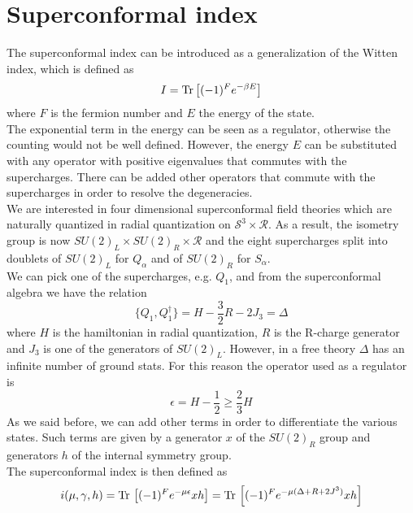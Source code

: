 \section{Superconformal index}
The superconformal index can be introduced as a generalization of the Witten index, which is defined as 
\begin{equation}
I = \mathrm{Tr } \,{ \left[   (-1)^F e^{-\beta E}\right]}
\end{equation}
where $F$ is the fermion number and $E$ the energy of the state.\\
The exponential term in the energy can be seen as a regulator, otherwise the counting would not be well defined.
However, the energy $E$ can be substituted with any operator with positive eigenvalues that commutes with the supercharges. 
There can be added other operators that commute with the supercharges in order to resolve the degeneracies.
\\
We are interested in four dimensional superconformal field theories which are naturally quantized in radial quantization on $\mathcal{S}^3 \times \mathcal{R}$. 
As a result, the isometry group is now $SU(2)_L \times SU(2)_R \times \mathcal{R}$ and the eight supercharges split into doublets of $SU(2)_L$ for $Q_{\alpha}$ and of $SU(2)_R$ for $S_{\alpha}$.\\
We can pick one of the supercharges, e.g. $Q_1$, and from the superconformal algebra we have the relation
\begin{equation}
 \{Q_1, Q_1^{\dagger} \} = H - \frac{3}{2} R - 2 J_3 = \Delta
 \end{equation} 
 where $H$ is the hamiltonian in radial quantization, $R$ is the R-charge generator and $J_3$ is one of the generators of $SU(2)_L$. 
 However, in a free theory $\Delta$ has an infinite number of ground stats. 
 For this reason the operator used as a regulator is \cite{Romelsberger:2005eg}
 \begin{equation}
 	\epsilon = H - \frac{1}{2} \geq \frac{2}{3} H 
 \end{equation}
As we said before, we can add other terms in order to differentiate the various states.
Such terms are given by a generator $x $ of the $SU(2)_R$ group and generators $h$ of the internal symmetry group.\\
The superconformal index is then defined as 
\begin{equation}
 i( \mu, \gamma,h) =
  \mathrm{Tr } \,  \left[  (-1)^F e^{ - \mu \epsilon } x h   \right] = 
 \mathrm{Tr } \, \left[  (-1)^F
  e^{- \mu (\Delta + R + 2 J^3)}  x h   \right]
 \end{equation} 
